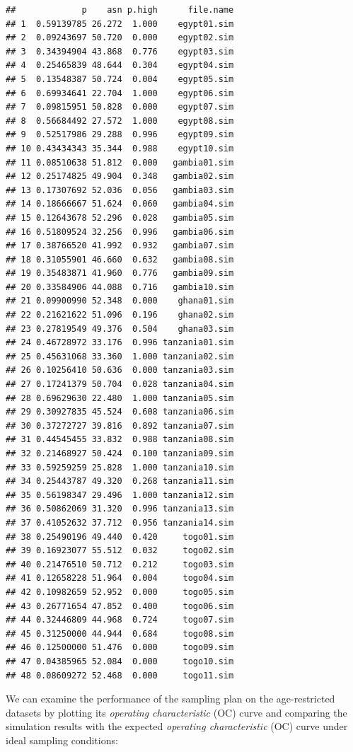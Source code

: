 \documentclass[12pt,a4paper]{book}
\theoremstyle{definition}
\theoremstyle{definition}
\theoremstyle{definition}
\theoremstyle{remark}
\begin{document}
\begin{verbatim}
##             p    asn p.high      file.name
## 1  0.59139785 26.272  1.000    egypt01.sim
## 2  0.09243697 50.720  0.000    egypt02.sim
## 3  0.34394904 43.868  0.776    egypt03.sim
## 4  0.25465839 48.644  0.304    egypt04.sim
## 5  0.13548387 50.724  0.004    egypt05.sim
## 6  0.69934641 22.704  1.000    egypt06.sim
## 7  0.09815951 50.828  0.000    egypt07.sim
## 8  0.56684492 27.572  1.000    egypt08.sim
## 9  0.52517986 29.288  0.996    egypt09.sim
## 10 0.43434343 35.344  0.988    egypt10.sim
## 11 0.08510638 51.812  0.000   gambia01.sim
## 12 0.25174825 49.904  0.348   gambia02.sim
## 13 0.17307692 52.036  0.056   gambia03.sim
## 14 0.18666667 51.624  0.060   gambia04.sim
## 15 0.12643678 52.296  0.028   gambia05.sim
## 16 0.51809524 32.256  0.996   gambia06.sim
## 17 0.38766520 41.992  0.932   gambia07.sim
## 18 0.31055901 46.660  0.632   gambia08.sim
## 19 0.35483871 41.960  0.776   gambia09.sim
## 20 0.33584906 44.088  0.716   gambia10.sim
## 21 0.09900990 52.348  0.000    ghana01.sim
## 22 0.21621622 51.096  0.196    ghana02.sim
## 23 0.27819549 49.376  0.504    ghana03.sim
## 24 0.46728972 33.176  0.996 tanzania01.sim
## 25 0.45631068 33.360  1.000 tanzania02.sim
## 26 0.10256410 50.636  0.000 tanzania03.sim
## 27 0.17241379 50.704  0.028 tanzania04.sim
## 28 0.69629630 22.480  1.000 tanzania05.sim
## 29 0.30927835 45.524  0.608 tanzania06.sim
## 30 0.37272727 39.816  0.892 tanzania07.sim
## 31 0.44545455 33.832  0.988 tanzania08.sim
## 32 0.21468927 50.424  0.100 tanzania09.sim
## 33 0.59259259 25.828  1.000 tanzania10.sim
## 34 0.25443787 49.320  0.268 tanzania11.sim
## 35 0.56198347 29.496  1.000 tanzania12.sim
## 36 0.50862069 31.320  0.996 tanzania13.sim
## 37 0.41052632 37.712  0.956 tanzania14.sim
## 38 0.25490196 49.440  0.420     togo01.sim
## 39 0.16923077 55.512  0.032     togo02.sim
## 40 0.21476510 50.712  0.212     togo03.sim
## 41 0.12658228 51.964  0.004     togo04.sim
## 42 0.10982659 52.952  0.000     togo05.sim
## 43 0.26771654 47.852  0.400     togo06.sim
## 44 0.32446809 44.968  0.724     togo07.sim
## 45 0.31250000 44.944  0.684     togo08.sim
## 46 0.12500000 51.476  0.000     togo09.sim
## 47 0.04385965 52.084  0.000     togo10.sim
## 48 0.08609272 52.468  0.000     togo11.sim
\end{verbatim}

We can examine the performance of the sampling plan on the
age-restricted datasets by plotting its \emph{operating characteristic}
(OC) curve and comparing the simulation results with the expected
\emph{operating characteristic} (OC) curve under ideal sampling
conditions:
\end{document}
